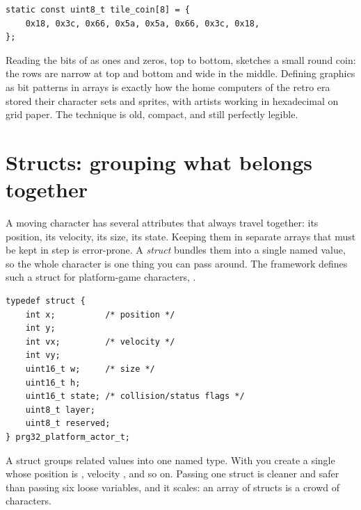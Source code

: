 \begin{lstlisting}[style=c,caption={An 8-by-8 tile as an array of eight bytes. Each byte is one row; each bit is one pixel. This is the platformer's coin tile.}]
static const uint8_t tile_coin[8] = {
    0x18, 0x3c, 0x66, 0x5a, 0x5a, 0x66, 0x3c, 0x18,
};
\end{lstlisting}

\begin{prgaside}
Reading the bits of  as ones and zeros, top to bottom, sketches a
small round coin: the rows are narrow at top and bottom and wide in the middle.
Defining graphics as bit patterns in arrays is exactly how the home computers of
the retro era stored their character sets and sprites, with artists working in
hexadecimal on grid paper. The technique is old, compact, and still perfectly
legible.
\end{prgaside}

\section{Structs: grouping what belongs together}

A moving character has several attributes that always travel together: its
position, its velocity, its size, its state. Keeping them in separate arrays that
must be kept in step is error-prone. A \emph{struct} bundles them into a single
named value, so the whole character is one thing you can pass around. The framework
defines such a struct for platform-game characters, 
\citep{prg32repo}.

\begin{lstlisting}[style=c,caption={The framework's actor struct (from \texttt{prg32.h}). Position, velocity, size, and state, grouped into one value.}]
typedef struct {
    int x;          /* position */
    int y;
    int vx;         /* velocity */
    int vy;
    uint16_t w;     /* size */
    uint16_t h;
    uint16_t state; /* collision/status flags */
    uint8_t layer;
    uint8_t reserved;
} prg32_platform_actor_t;
\end{lstlisting}

\begin{prgconcept}
A struct groups related values into one named type. With
 you create a single  whose
position is , velocity , and so on. Passing one
struct is cleaner and safer than passing six loose variables, and it scales: an
array of structs is a crowd of characters.
\end{prgconcept}

